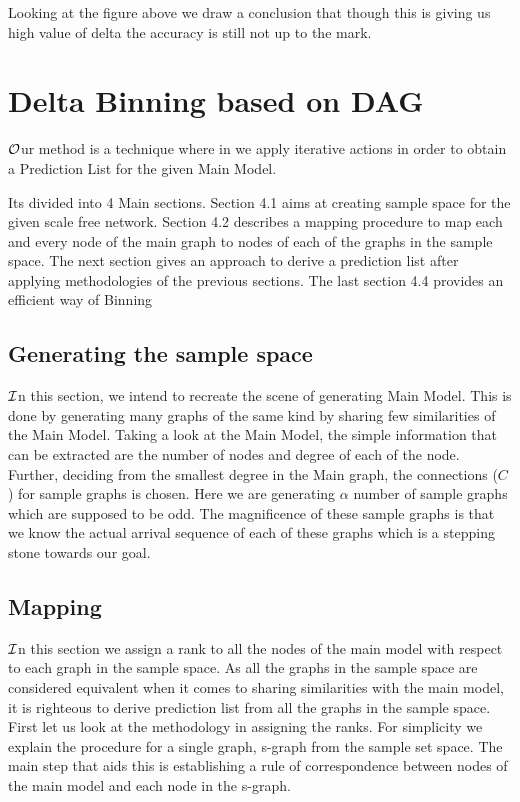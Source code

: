 \documentclass{article}
\begin{document}
Looking at the figure above we draw a conclusion that though this is giving us high value of delta the accuracy is still not up to the mark.

\section{Delta Binning based on DAG}
\hspace{.18in} $\cal O$ur method is a technique where in we apply iterative actions in order to obtain a Prediction List for the given Main Model. 

Its divided into 4 Main sections. 
Section 4.1 aims at creating sample space for the given scale free network.
Section 4.2 describes a mapping procedure to map each and every node of the main graph to nodes of each of the graphs in the sample space. The next section gives an approach to derive a prediction list after applying methodologies of the previous sections. The last section 4.4 provides an efficient way of Binning
\subsection{Generating the sample space}
\hspace{.17in}$\cal I$n this section, we intend to recreate the scene of generating Main Model. This is done by generating many graphs of the same kind by sharing few similarities of the Main Model. Taking a look at the Main Model, the simple information that can be extracted are the number of nodes and degree of each of the node. Further, deciding from the smallest degree in the Main graph, the connections ($C$) for sample graphs is chosen. Here we are generating $\alpha$ number of sample graphs which are supposed to be odd. The magnificence of these sample graphs is that we know the actual arrival sequence of each of these graphs which is a stepping stone towards our goal.
\subsection{Mapping}
\hspace{.17in} $\cal I$n this section we assign a rank to all the nodes of the main model with respect to each graph in the sample space. As all the graphs in the sample space are considered equivalent when it comes to sharing similarities with the main model, it is righteous to derive prediction list from all the graphs in the sample space. First let us look at the methodology in assigning the ranks. For simplicity we explain the procedure for a single graph, s-graph from the sample set space. The main step that aids this is establishing a rule of correspondence between nodes of the main model and each node in the s-graph.
\end{document}

